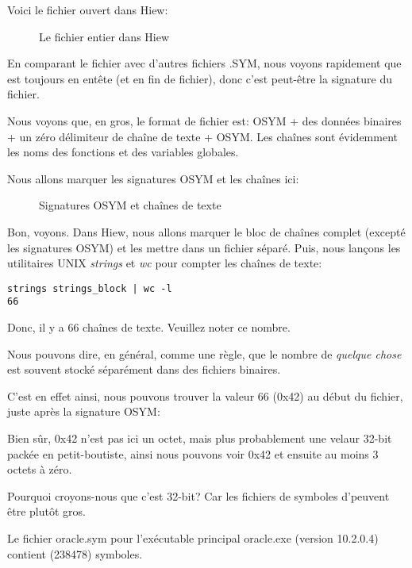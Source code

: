 \clearpage
Voici le fichier ouvert dans Hiew:

\begin{figure}[H]
\centering
{}
\caption{Le fichier entier dans Hiew}
\label{fig:oracle_SYM_whole1}
\end{figure}

En comparant le fichier avec d'autres fichiers .SYM, nous voyons rapidement que
 est toujours en entête (et en fin de fichier), donc c'est peut-être la signature du fichier.

Nous voyons que, en gros, le format de fichier est: OSYM + des données binaires
+ un zéro délimiteur de chaîne de texte + OSYM.
Les chaînes sont évidemment les noms des fonctions et des variables globales.

\clearpage
Nous allons marquer les signatures OSYM et les chaînes ici:

\begin{figure}[H]
\centering
{}
\caption{Signatures OSYM et chaînes de texte}
\label{fig:oracle_SYM_whole2}
\end{figure}

Bon, voyons.
Dans Hiew, nous allons marquer le bloc de chaînes complet (excepté les signatures
OSYM) et les mettre dans un fichier séparé.
Puis, nous lançons les utilitaires UNIX \emph{strings} et \emph{wc} pour compter
les chaînes de texte:

\begin{lstlisting}
strings strings_block | wc -l
66
\end{lstlisting}

Donc, il y a 66 chaînes de texte.
Veuillez noter ce nombre.

Nous pouvons dire, en général, comme une règle, que le nombre de \emph{quelque chose}
est souvent stocké séparément dans des fichiers binaires.

C'est en effet ainsi, nous pouvons trouver la valeur 66 (0x42) au début du fichier,
juste après la signature OSYM:



Bien sûr, 0x42 n'est pas ici un octet, mais plus probablement une velaur 32-bit
packée en petit-boutiste, ainsi nous pouvons voir 0x42 et ensuite au moins 3 octets
à zéro.

Pourquoi croyons-nous que c'est 32-bit?
Car les fichiers de symboles d'\oracle peuvent être plutôt gros.

Le fichier oracle.sym pour l'exécutable principal oracle.exe (version 10.2.0.4)
contient  (238478) symboles.

